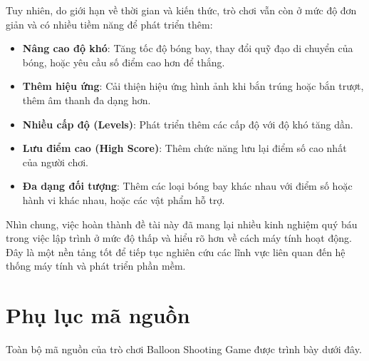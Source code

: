 \documentclass[12pt,a4paper,openany,oneside]{report}
\begin{document}
Tuy nhiên, do giới hạn về thời gian và kiến thức, trò chơi vẫn còn ở mức độ đơn giản và có nhiều tiềm năng để phát triển thêm:
\begin{itemize}
    \item \textbf{Nâng cao độ khó}: Tăng tốc độ bóng bay, thay đổi quỹ đạo di chuyển của bóng, hoặc yêu cầu số điểm cao hơn để thắng.
    \item \textbf{Thêm hiệu ứng}: Cải thiện hiệu ứng hình ảnh khi bắn trúng hoặc bắn trượt, thêm âm thanh đa dạng hơn.
    \item \textbf{Nhiều cấp độ (Levels)}: Phát triển thêm các cấp độ với độ khó tăng dần.
    \item \textbf{Lưu điểm cao (High Score)}: Thêm chức năng lưu lại điểm số cao nhất của người chơi.
    \item \textbf{Đa dạng đối tượng}: Thêm các loại bóng bay khác nhau với điểm số hoặc hành vi khác nhau, hoặc các vật phẩm hỗ trợ.
\end{itemize}

Nhìn chung, việc hoàn thành đề tài này đã mang lại nhiều kinh nghiệm quý báu trong việc lập trình ở mức độ thấp và hiểu rõ hơn về cách máy tính hoạt động. Đây là một nền tảng tốt để tiếp tục nghiên cứu các lĩnh vực liên quan đến hệ thống máy tính và phát triển phần mềm.

\appendix
\chapter{Phụ lục mã nguồn}
Toàn bộ mã nguồn của trò chơi Balloon Shooting Game được trình bày dưới đây.
\end{document}
